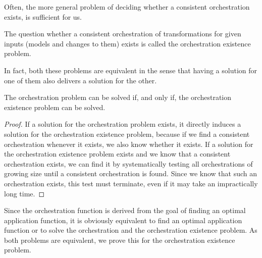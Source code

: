 Often, the more general problem of deciding whether a consistent orchestration exists, is sufficient for us.
\begin{definition}
    \label{def:orchestrationexistenceproblem}
    The question whether a consistent orchestration of transformations for given inputs (models and changes to them) exists is called the orchestration existence problem.
\end{definition}

In fact, both these problems are equivalent in the sense that having a solution for one of them also delivers a solution for the other.
\begin{theorem}
    The orchestration problem can be solved if, and only if, the orchestration existence problem can be solved.
\end{theorem}
\begin{proof}
    If a solution for the orchestration problem exists, it directly induces a solution for the orchestration existence problem, because if we find a consistent orchestration whenever it exists, we also know whether it exists.
    If a solution for the orchestration existence problem exists and we know that a consistent orchestration exists, we can find it by systematically testing all orchestrations of growing size until a consistent orchestration is found. Since we know that such an orchestration exists, this test must terminate, even if it may take an impractically long time.
\end{proof}

Since the orchestration function is derived from the goal of finding an optimal application function, it is obviously equivalent to find an optimal application function or to solve the orchestration and the orchestration existence problem.
As both problems are equivalent, we prove this for the orchestration existence problem.

